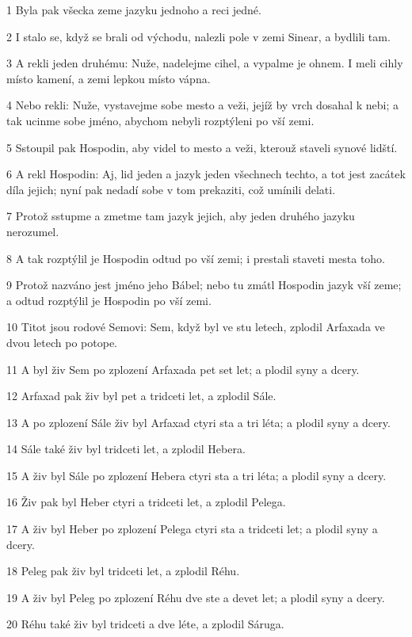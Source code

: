 \par 1 Byla pak všecka zeme jazyku jednoho a reci jedné.
\par 2 I stalo se, když se brali od východu, nalezli pole v zemi Sinear, a bydlili tam.
\par 3 A rekli jeden druhému: Nuže, nadelejme cihel, a vypalme je ohnem. I meli cihly místo kamení, a zemi lepkou místo vápna.
\par 4 Nebo rekli: Nuže, vystavejme sobe mesto a veži, jejíž by vrch dosahal k nebi; a tak ucinme sobe jméno, abychom nebyli rozptýleni po vší zemi.
\par 5 Sstoupil pak Hospodin, aby videl to mesto a veži, kterouž staveli synové lidští.
\par 6 A rekl Hospodin: Aj, lid jeden a jazyk jeden všechnech techto, a tot jest zacátek díla jejich; nyní pak nedadí sobe v tom prekaziti, což umínili delati.
\par 7 Protož sstupme a zmetme tam jazyk jejich, aby jeden druhého jazyku nerozumel.
\par 8 A tak rozptýlil je Hospodin odtud po vší zemi; i prestali staveti mesta toho.
\par 9 Protož nazváno jest jméno jeho Bábel; nebo tu zmátl Hospodin jazyk vší zeme; a odtud rozptýlil je Hospodin po vší zemi.
\par 10 Titot jsou rodové Semovi: Sem, když byl ve stu letech, zplodil Arfaxada ve dvou letech po potope.
\par 11 A byl živ Sem po zplození Arfaxada pet set let; a plodil syny a dcery.
\par 12 Arfaxad pak živ byl pet a tridceti let, a zplodil Sále.
\par 13 A po zplození Sále živ byl Arfaxad ctyri sta a tri léta; a plodil syny a dcery.
\par 14 Sále také živ byl tridceti let, a zplodil Hebera.
\par 15 A živ byl Sále po zplození Hebera ctyri sta a tri léta; a plodil syny a dcery.
\par 16 Živ pak byl Heber ctyri a tridceti let, a zplodil Pelega.
\par 17 A živ byl Heber po zplození Pelega ctyri sta a tridceti let; a plodil syny a dcery.
\par 18 Peleg pak živ byl tridceti let, a zplodil Réhu.
\par 19 A živ byl Peleg po zplození Réhu dve ste a devet let; a plodil syny a dcery.
\par 20 Réhu také živ byl tridceti a dve léte, a zplodil Sáruga.
